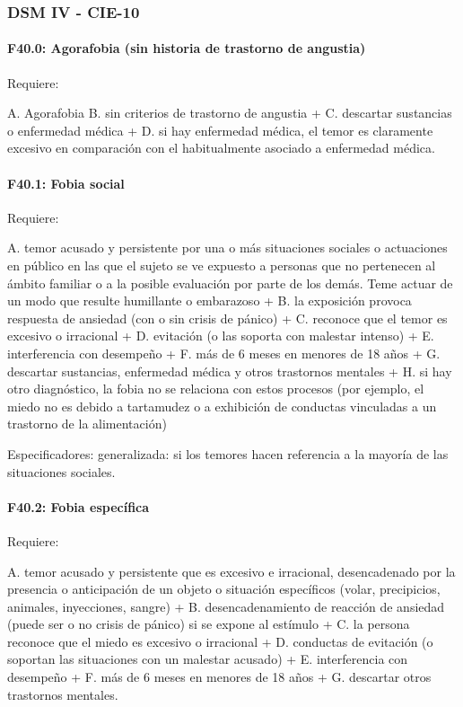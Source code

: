\documentclass{scrbook}
\begin{document}
\subsubsection*{DSM IV - CIE-10}
\paragraph{F40.0: Agorafobia (sin historia de trastorno de angustia)}
Requiere:

A. Agorafobia
B. sin criterios de trastorno de angustia +
C. descartar sustancias o enfermedad médica +
D. si hay enfermedad médica, el temor es claramente excesivo en comparación con el habitualmente asociado a enfermedad médica.

\paragraph{F40.1: Fobia social}
Requiere:

A. temor acusado y persistente por una o más situaciones sociales o actuaciones en público en las que el sujeto se ve expuesto a personas que no pertenecen al ámbito familiar o a la posible evaluación por parte de los demás. Teme actuar de un modo que resulte humillante o embarazoso +
B. la exposición provoca respuesta de ansiedad (con o sin crisis de pánico) +
C. reconoce que el temor es excesivo o irracional +
D. evitación (o las soporta con malestar intenso) +
E. interferencia con desempeño +
F. más de 6 meses en menores de 18 años +
G. descartar sustancias, enfermedad médica y otros trastornos mentales +
H. si hay otro diagnóstico, la fobia no se relaciona con estos procesos (por ejemplo, el miedo no es debido a tartamudez o a exhibición de conductas vinculadas a un trastorno de la alimentación)

Especificadores: generalizada: si los temores hacen referencia a la mayoría de las situaciones sociales.

\paragraph{F40.2: Fobia específica}
Requiere:

A. temor acusado y persistente que es excesivo e irracional, desencadenado por la presencia o anticipación de un objeto o situación específicos (volar, precipicios, animales, inyecciones, sangre) +
B. desencadenamiento de reacción de ansiedad (puede ser o no crisis de pánico) si se expone al estímulo +
C. la persona reconoce que el miedo es excesivo o irracional +
D. conductas de evitación (o soportan las situaciones con un malestar acusado) +
E. interferencia con desempeño +
F. más de 6 meses en menores de 18 años +
G. descartar otros trastornos mentales.
\end{document}
